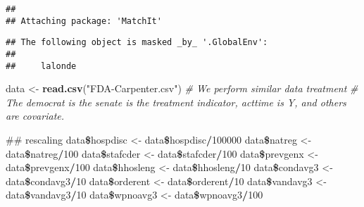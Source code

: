 \documentclass[]{article}
\newenvironment{Shaded}{\begin{snugshade}}{\end{snugshade}}
\newcommand{\KeywordTok}[1]{\textcolor[rgb]{0.13,0.29,0.53}{\textbf{#1}}}
\newcommand{\DecValTok}[1]{\textcolor[rgb]{0.00,0.00,0.81}{#1}}
\newcommand{\StringTok}[1]{\textcolor[rgb]{0.31,0.60,0.02}{#1}}
\newcommand{\CommentTok}[1]{\textcolor[rgb]{0.56,0.35,0.01}{\textit{#1}}}
\newcommand{\OperatorTok}[1]{\textcolor[rgb]{0.81,0.36,0.00}{\textbf{#1}}}
\newcommand{\NormalTok}[1]{#1}
\begin{document}
\begin{verbatim}
## 
## Attaching package: 'MatchIt'
\end{verbatim}

\begin{verbatim}
## The following object is masked _by_ '.GlobalEnv':
## 
##     lalonde
\end{verbatim}

\begin{Shaded}
\begin{Highlighting}[]
\NormalTok{data <-}\StringTok{ }\KeywordTok{read.csv}\NormalTok{(}\StringTok{"FDA-Carpenter.csv"}\NormalTok{)}
\CommentTok{# We perform similar data treatment }
\CommentTok{# The democrat is the senate is the treatment indicator, acttime is Y, and others are covariate.}

\NormalTok{## rescaling}
\NormalTok{data}\OperatorTok{\$}\NormalTok{hospdisc <-}\StringTok{ }\NormalTok{data}\OperatorTok{\$}\NormalTok{hospdisc}\OperatorTok{/}\DecValTok{100000}
\NormalTok{data}\OperatorTok{\$}\NormalTok{natreg <-}\StringTok{ }\NormalTok{data}\OperatorTok{\$}\NormalTok{natreg}\OperatorTok{/}\DecValTok{100}
\NormalTok{data}\OperatorTok{\$}\NormalTok{stafcder <-}\StringTok{ }\NormalTok{data}\OperatorTok{\$}\NormalTok{stafcder}\OperatorTok{/}\DecValTok{100}
\NormalTok{data}\OperatorTok{\$}\NormalTok{prevgenx <-}\StringTok{ }\NormalTok{data}\OperatorTok{\$}\NormalTok{prevgenx}\OperatorTok{/}\DecValTok{100}
\NormalTok{data}\OperatorTok{\$}\NormalTok{hhosleng <-}\StringTok{ }\NormalTok{data}\OperatorTok{\$}\NormalTok{hhosleng}\OperatorTok{/}\DecValTok{10}
\NormalTok{data}\OperatorTok{\$}\NormalTok{condavg3 <-}\StringTok{ }\NormalTok{data}\OperatorTok{\$}\NormalTok{condavg3}\OperatorTok{/}\DecValTok{10}
\NormalTok{data}\OperatorTok{\$}\NormalTok{orderent <-}\StringTok{ }\NormalTok{data}\OperatorTok{\$}\NormalTok{orderent}\OperatorTok{/}\DecValTok{10}
\NormalTok{data}\OperatorTok{\$}\NormalTok{vandavg3 <-}\StringTok{ }\NormalTok{data}\OperatorTok{\$}\NormalTok{vandavg3}\OperatorTok{/}\DecValTok{10}
\NormalTok{data}\OperatorTok{\$}\NormalTok{wpnoavg3 <-}\StringTok{ }\NormalTok{data}\OperatorTok{\$}\NormalTok{wpnoavg3}\OperatorTok{/}\DecValTok{100}


\end{Highlighting}
\end{Shaded}
\end{document}

